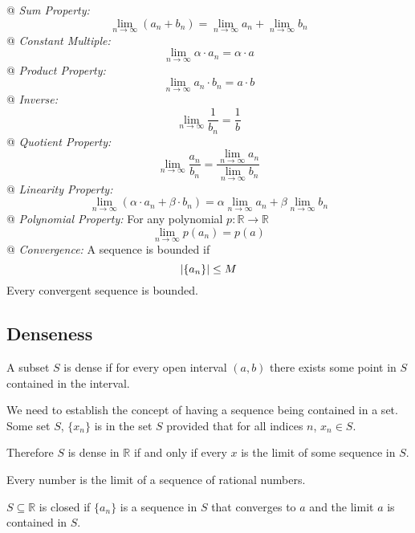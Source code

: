     \begin{easylist}[itemize]
        @ \textit{Sum Property:}
        \[
            \lim_{n \to \infty} \left( a_n + b_n \right) = \lim_{n \to \infty} a_n + \lim_{n \to \infty} b_n
        \]
        @ \textit{Constant Multiple:}
        \[
            \lim_{n \to \infty} \alpha \cdot a_n = \alpha \cdot a
        \]
        @ \textit{Product Property:}
        \[
            \lim_{n \to \infty} a_n \cdot b_n = a \cdot b
        \]
        @ \textit{Inverse:}
        \[
            \lim_{n \to \infty} \frac{1}{b_n} = \frac{1}{b}
        \]
        @ \textit{Quotient Property:}
        \[
            \lim_{n \to \infty} \frac{a_n}{b_n} = \frac{\lim_{n \to \infty} a_n}{\lim_{n \to \infty} b_n}
        \]
        @ \textit{Linearity Property:}
        \[
            \lim_{n \to \infty} \left( \alpha \cdot a_n + \beta \cdot b_n\right) =
                \alpha \lim_{n \to \infty} a_n + \beta \lim_{n \to \infty} b_n
        \]
        @ \textit{Polynomial Property:} For any polynomial $p: \mathbb{R} \to \mathbb{R}$
        \[
            \lim_{n \to \infty} p(a_n) = p(a)
        \]
        @ \textit{Convergence:} A sequence is bounded if
        \[
            {\left\lvert \{a_n\} \right\rvert} \le M
        \]
        Every convergent sequence is bounded.
    \end{easylist}

    \subsection{Denseness}
    \begin{definition}[Dense]
        A subset $S$ is dense if for every open interval $(a, b)$ there exists some point in $S$ contained in the
        interval.
    \end{definition}

    We need to establish the concept of having a sequence being contained in a set. Some set $S$, $\{x_n\}$ is in the
    set $S$ provided that for all indices $n$, $x_n \in S$.

    Therefore $S$ is dense in $\mathbb{R}$ if and only if every $x$ is the limit of some sequence in $S$.

    \begin{definition}
        Every number is the limit of a sequence of rational numbers.
    \end{definition}

    \begin{definition}[Closed]
        $S \subseteq \mathbb{R}$ is closed if $\{a_n\}$ is a sequence in $S$ that converges to $a$ and the limit $a$ is
        contained in $S$.
    \end{definition}

